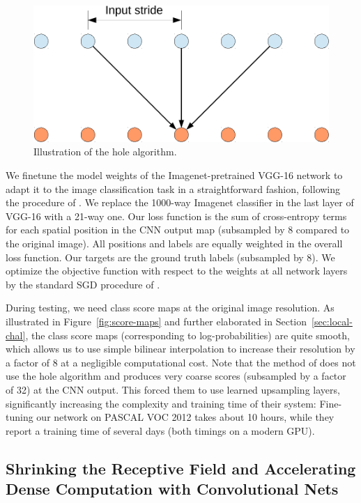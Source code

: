 \begin{figure}
  \centering
  \includegraphics[width=0.7\linewidth]{fig/atrous.pdf}
  \caption{Illustration of the hole algorithm.}
  \label{fig:hole}
\end{figure}


We finetune the model weights of the Imagenet-pretrained VGG-16 network to
adapt it to the image classification task in a straightforward fashion,
following the procedure of \citet{long2014fully}. We replace the 1000-way
Imagenet classifier in the last layer of VGG-16 with a 21-way one. Our loss
function is the sum of cross-entropy terms for each spatial position in the
CNN output map (subsampled by 8 compared to the original image). All positions
and labels are equally weighted in the overall loss function. Our targets are
the ground truth labels (subsampled by 8). We optimize the objective function
with respect to the weights at all network layers by the standard SGD
procedure of \citet{KrizhevskyNIPS2013}.

During testing, we need class score maps at the original image resolution. As
illustrated in Figure~\ref{fig:score-maps} and further elaborated in
Section~\ref{sec:local-chal}, the class score maps (corresponding to
log-probabilities) are quite smooth, which allows us to use simple bilinear
interpolation to increase their resolution by a factor of 8 at a negligible
computational cost. Note that the method of \citet{long2014fully} does not use
the hole algorithm and produces very coarse scores (subsampled by a factor of
32) at the CNN output. This forced them to use learned upsampling layers,
significantly increasing the complexity and training time of their system:
Fine-tuning our network on PASCAL VOC 2012 takes about 10 hours, while
they report a training time of several days (both timings on a modern GPU).

\subsection{Shrinking the Receptive Field and Accelerating Dense Computation
  with Convolutional Nets}
\label{sec:convnet-field}

